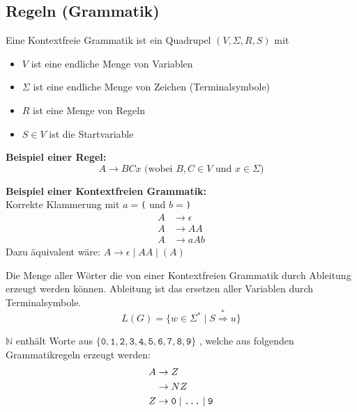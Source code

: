 \documentclass[a4paper]{article}
\begin{document}
\subsection{Regeln (Grammatik)}
	\begin{multicols}{2}
	
	\begin{fdef}
	Eine Kontextfreie Grammatik ist ein Quadrupel $(V, \Sigma, R, S)$ mit
	\begin{itemize}
		\item $V$ ist eine endliche Menge von Variablen
		\item $\Sigma$ ist eine endliche Menge von Zeichen (Terminalsymbole)
		\item $R$ ist eine Menge von Regeln
		\item $S \in V$ ist die Startvariable
	\end{itemize}
	\end{fdef}
	
	\textbf{Beispiel einer Regel:}
	$$A \rightarrow BCx \text{ (wobei $B,C \in V$ und $x \in \Sigma$)}$$
	
	\textbf{Beispiel einer Kontextfreien Grammatik:} \\
	Korrekte Klammerung mit $a=$\texttt{(} und  $b=$\texttt{)}
	\begin{align*}
		A & \rightarrow \epsilon \\
		A & \rightarrow AA \\
		A & \rightarrow aAb
	\end{align*}
	Dazu äquivalent wäre: $A \rightarrow \epsilon \mid AA \mid (A)$

	\begin{fdef}
	Die Menge aller Wörter die von einer Kontextfreien Grammatik durch Ableitung erzeugt werden können. Ableitung ist das ersetzen aller Variablen durch Terminalsymbole.
	$$L(G)  = \{ w \in \Sigma^* \mid S \stackrel{*}{\Rightarrow} u \}$$
	\end{fdef}

	\begin{fmerke}
	$\mathbb{N}$ enthält Worte aus 
	$\{\texttt{0},\texttt{1},\texttt{2},\texttt{3},
	   \texttt{4},\texttt{5},\texttt{6},
	   \texttt{7},\texttt{8},\texttt{9} \}$
	, welche aus folgenden Grammatikregeln erzeugt werden:
	\begin{align*}
		A & \rightarrow Z \\
		  & \rightarrow NZ \\
		Z & \rightarrow \texttt{0} \mid \texttt{\dots} \mid \texttt{9}
	\end{align*}
	\end{fmerke}
	

\end{multicols}
\end{document}
